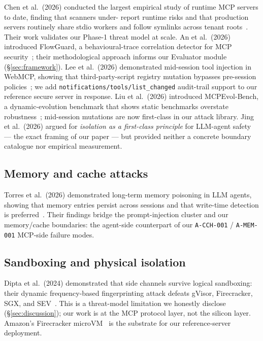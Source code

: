 Chen et al.~(2026) conducted the largest empirical study of
runtime MCP servers to date, finding that scanners under-
report runtime risks and that production servers routinely
share stdio workers and follow symlinks across tenant
roots~\cite{chen_2026_mcp_security}. Their work validates our
Phase-1 threat model at scale. An et al.~(2026) introduced
FlowGuard, a behavioural-trace correlation detector for MCP
security~\cite{an_2026_flowguard}; their methodological
approach informs our Evaluator module (\S\ref{sec:framework}).
Lee et al.~(2026) demonstrated mid-session tool injection in
WebMCP, showing that third-party-script registry mutation
bypasses pre-session policies~\cite{lee_2026_webmcp}; we add
\texttt{notifications/tools/list\_changed} audit-trail support
to our reference secure server in response. Liu et al.~(2026)
introduced MCPEvol-Bench, a dynamic-evolution benchmark that
shows static benchmarks overstate robustness~\cite{liu_2026_mcpevol};
mid-session mutations are now first-class in our attack
library. Jing et al.~(2026) argued for \emph{isolation as a
first-class principle} for LLM-agent
safety~\cite{jing_2026_isolation} --- the exact framing of
our paper --- but provided neither a concrete boundary
catalogue nor empirical measurement.

\subsection{Memory and cache attacks}

Torres et al.~(2026) demonstrated long-term memory poisoning
in LLM agents, showing that memory entries persist across
sessions and that write-time detection is
preferred~\cite{torres_2026_memory}. Their findings bridge the
prompt-injection cluster and our memory/cache boundaries: the
agent-side counterpart of our \texttt{A-CCH-001} /
\texttt{A-MEM-001} MCP-side failure modes.

\subsection{Sandboxing and physical isolation}

Dipta et al.~(2024) demonstrated that side channels survive
logical sandboxing: their dynamic frequency-based
fingerprinting attack defeats gVisor, Firecracker, SGX, and
SEV~\cite{dipta_2024_sandbox}. This is a threat-model
limitation we honestly disclose (\S\ref{sec:discussion}); our
work is at the MCP protocol layer, not the silicon layer.
Amazon's Firecracker microVM~\cite{firecracker_github} is the
substrate for our reference-server deployment.


